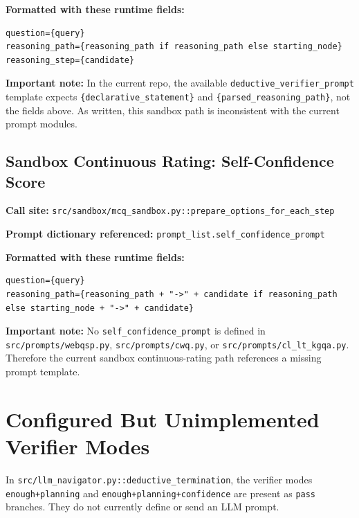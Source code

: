 \documentclass[11pt]{article}
\begin{document}
\textbf{Formatted with these runtime fields:}
\begin{lstlisting}[style=prompt]
question={query}
reasoning_path={reasoning_path if reasoning_path else starting_node}
reasoning_step={candidate}
\end{lstlisting}

\textbf{Important note:} In the current repo, the available
\texttt{deductive\_verifier\_prompt} template expects
\texttt{\{declarative\_statement\}} and \texttt{\{parsed\_reasoning\_path\}},
not the fields above. As written, this sandbox path is inconsistent with the
current prompt modules.

\subsection{Sandbox Continuous Rating: Self-Confidence Score}

\textbf{Call site:} \texttt{src/sandbox/mcq\_sandbox.py::prepare\_options\_for\_each\_step}

\textbf{Prompt dictionary referenced:} \texttt{prompt\_list.self\_confidence\_prompt}

\textbf{Formatted with these runtime fields:}
\begin{lstlisting}[style=prompt]
question={query}
reasoning_path={reasoning_path + "->" + candidate if reasoning_path else starting_node + "->" + candidate}
\end{lstlisting}

\textbf{Important note:} No \texttt{self\_confidence\_prompt} is defined in
\texttt{src/prompts/webqsp.py}, \texttt{src/prompts/cwq.py}, or
\texttt{src/prompts/cl\_lt\_kgqa.py}. Therefore the current sandbox
continuous-rating path references a missing prompt template.

\section{Configured But Unimplemented Verifier Modes}

In \texttt{src/llm\_navigator.py::deductive\_termination}, the verifier modes
\texttt{enough+planning} and \texttt{enough+planning+confidence} are present as
\texttt{pass} branches. They do not currently define or send an LLM prompt.
\end{document}
